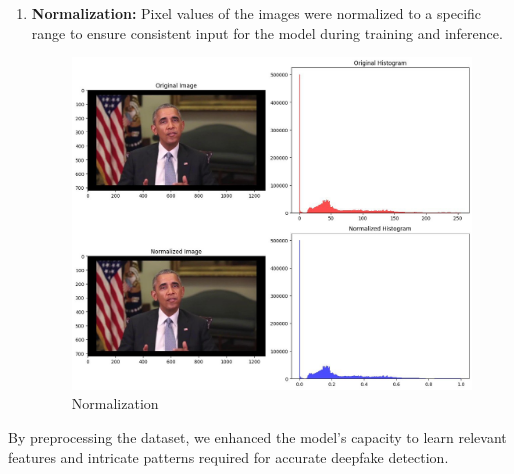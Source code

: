 \begin{enumerate}
    \item \textbf{Normalization:} Pixel values of the images were normalized to a specific range to ensure consistent input for the model during training and inference.
          \begin{figure}[htbp]
              \centering
              \includegraphics[width= 5in ]{img/normalized.jpg}
              \caption{Normalization}
          \end{figure}
\end{enumerate}

\noindent By preprocessing the dataset, we enhanced the model's capacity to learn relevant features and intricate patterns required for accurate deepfake detection.
